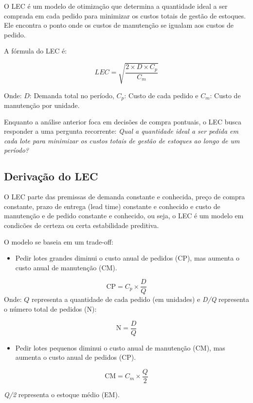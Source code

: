 \documentclass[
  a4paper,
]{book}
\providecommand{\tightlist}{%
  \setlength{\itemsep}{0pt}\setlength{\parskip}{0pt}}\usepackage{longtable,booktabs,array}
\begin{document}
O LEC é um modelo de otimização que determina a quantidade ideal a ser
comprada em cada pedido para minimizar os custos totais de gestão de
estoques. Ele encontra o ponto onde os custos de manutenção se igualam
aos custos de pedido.

A fórmula do LEC é:

\[
LEC = \sqrt{\frac{2 \times D \times C_p}{C_m}}
\]

Onde: \(D\): Demanda total no período, \(C_p\): Custo de cada pedido e
\(C_m\): Custo de manutenção por unidade.

Enquanto a análise anterior foca em decisões de compra pontuais, o LEC
busca responder a uma pergunta recorrente: \emph{Qual a quantidade ideal
a ser pedida em cada lote para minimizar os custos totais de gestão de
estoques ao longo de um período?}

\subsection{Derivação do LEC}\label{derivauxe7uxe3o-do-lec}

O LEC parte das premissas de demanda constante e conhecida, preço de
compra constante, prazo de entrega (lead time) constante e conhecido e
custo de manutenção e de pedido constante e conhecido, ou seja, o LEC é
um modelo em condicões de certeza ou certa estabilidade preditiva.

O modelo se baseia em um trade-off:

\begin{itemize}
\tightlist
\item
  Pedir lotes grandes diminui o custo anual de pedidos (CP), mas aumenta
  o custo anual de manutenção (CM).
\end{itemize}

\[
\text{CP} = C_p \times \frac{D}{Q}
\] Onde: \(Q\) representa a quantidade de cada pedido (em unidades) e
\emph{D/Q} representa o número total de pedidos (N):

\[
\text{N} = \frac{D}{Q}
\]

\begin{itemize}
\tightlist
\item
  Pedir lotes pequenos diminui o custo anual de manutenção (CM), mas
  aumenta o custo anual de pedidos (CP).
\end{itemize}

\[
\text{CM} = C_m \times \frac{Q}{2}
\]

\emph{Q/2} representa o estoque médio (EM).
\end{document}
